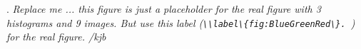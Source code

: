 \label{fig:BlueGreenRed}. \textit{Replace me ... this figure is just a placeholder for the real figure with 3 histograms and 9 images. But use this label (\verb|\\label\{fig:BlueGreenRed\}. |) for the real figure. /kjb}
